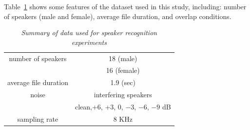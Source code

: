 Table~\ref{tab:data_summary} shows some features of the dataset used in this study, including: number of speakers (male and female), average file duration, and overlap conditions. 

\begin{table}[h!]
	\begin{center}
		\begin{tabular}{| c | c |}
			\hline
			\hline
			number of speakers	& 18 (male)  \\
			\hspace{4mm}			&  16 (female) \\
			\hline
			average file duration	&   1.9 (sec) \\ 
			\hline
			noise				& interfering speakers \\
			\hspace{4mm}			& clean,$+6$, $+3$, $0$, $-3$, $-6$, $-9$ dB \\
			\hline
			sampling rate			& $8$ KHz \\
			\hline
			\hline	
		\end{tabular}
		\caption{\it Summary of data used for speaker recognition experiments}
		\label{tab:data_summary}
	\end{center}
\end{table}

\newpage
